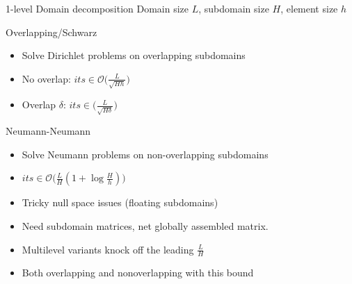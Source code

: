 \begin{frame}{1-level Domain decomposition}
  Domain size $L$, subdomain size $H$, element size $h$
  \begin{block}{Overlapping/Schwarz}
    \begin{itemize}\item Solve Dirichlet problems on overlapping
      subdomains
    \item No overlap: $\textit{its} \in \mathcal{O}\big( \frac{L}{\sqrt{Hh}} \big)$
    \item Overlap $\delta$: $\textit{its} \in \big( \frac L {\sqrt{H\delta}} \big)$
    \end{itemize}
  \end{block}
  \begin{block}{Neumann-Neumann}
    \begin{itemize}
    \item Solve Neumann problems on non-overlapping subdomains
    \item $\textit{its} \in \mathcal{O}\big( \frac{L}{H}(1+\log\frac H h) \big)$
    \item Tricky null space issues (floating subdomains)
    \item Need subdomain matrices, net globally assembled matrix.
    \end{itemize}
  \end{block}
  \begin{itemize}
  \item Multilevel variants knock off the leading $\frac L H$
  \item Both overlapping and nonoverlapping with this bound
  \end{itemize}
\end{frame}

